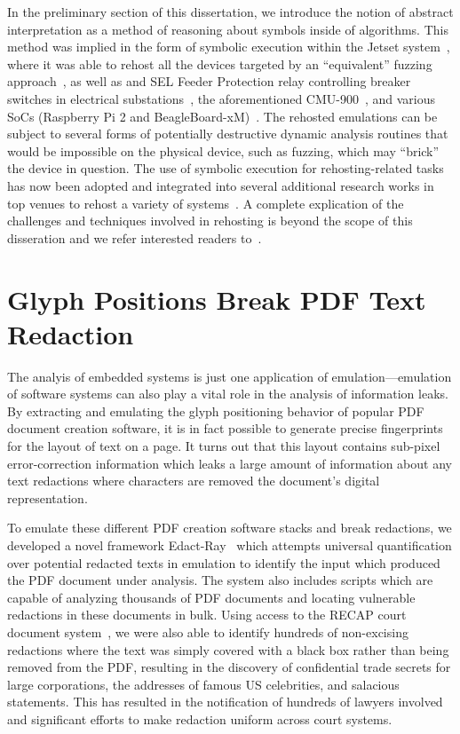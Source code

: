 In the preliminary section of this dissertation, we introduce the notion of abstract interpretation as a method of reasoning about symbols inside of algorithms.
This method was implied in the form of symbolic execution within the Jetset system~\cite{johnson2021jetset}, where it was able to rehost all the devices targeted by an ``equivalent'' fuzzing approach~\cite{p2im2020}, as well as and SEL Feeder Protection relay controlling breaker switches in electrical substations~\cite{feederprotection}, the aforementioned CMU-900~\cite{cmudevice}, and various SoCs (Raspberry Pi 2 and BeagleBoard-xM)~\cite{raspbpi, beagleboard}.
The rehosted emulations can be subject to several forms of potentially destructive dynamic analysis routines that would be impossible on the physical device, such as fuzzing, which may ``brick'' the device in question.
The use of symbolic execution for rehosting-related tasks has now been adopted and integrated into several additional research works in top venues to rehost a variety of systems~\cite{zhou2022your, chen2022metaemu, hernandez2022firmwire, sun2022spenny}.
A complete explication of the challenges and techniques involved in rehosting is beyond the scope of this disseration and we refer interested readers to~\cite{wright2021challenges}.

\section{Glyph Positions Break PDF Text Redaction}

The analyis of embedded systems is just one application of emulation---emulation of software systems can also play a vital role in the analysis of information leaks.
By extracting and emulating the glyph positioning behavior of popular PDF document creation software, it is in fact possible to generate precise fingerprints for the layout of text on a page.
It turns out that this layout contains sub-pixel error-correction information which leaks a large amount of information about any text redactions where characters are removed the document's digital representation.

To emulate these different PDF creation software stacks and break redactions, we developed a novel framework Edact-Ray~\cite{bland2023story} which attempts universal quantification over potential redacted texts in emulation to identify the input which produced the PDF document under analysis.
The system also includes scripts which are capable of analyzing thousands of PDF documents and locating vulnerable redactions in these documents in bulk.
Using access to the RECAP court document system~\cite{recap}, we were also able to identify hundreds of non-excising redactions where the text was simply covered with a black box rather than being removed from the PDF, resulting in the discovery of confidential trade secrets for large corporations, the addresses of famous US celebrities, and salacious statements.
This has resulted in the notification of hundreds of lawyers involved and significant efforts to make redaction uniform across court systems.

